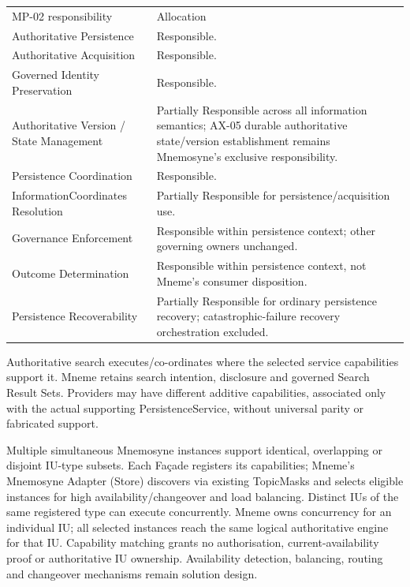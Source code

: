 \begin{longtable}{>{\raggedright\arraybackslash}p{}>{\raggedright\arraybackslash}p{}}
MP-02 responsibility & Allocation \\
Authoritative Persistence & Responsible. \\
Authoritative Acquisition & Responsible. \\
Governed Identity Preservation & Responsible. \\
Authoritative Version / State Management & Partially Responsible across all information semantics; AX-05 durable authoritative state/version establishment remains Mnemosyne’s exclusive responsibility. \\
Persistence Coordination & Responsible. \\
InformationCoordinates Resolution & Partially Responsible for persistence/acquisition use. \\
Governance Enforcement & Responsible within persistence context; other governing owners unchanged. \\
Outcome Determination & Responsible within persistence context, not Mneme’s consumer disposition. \\
Persistence Recoverability & Partially Responsible for ordinary persistence recovery; catastrophic-failure recovery orchestration excluded. \\
\end{longtable}


Authoritative search executes/co-ordinates where the selected service capabilities support it. Mneme retains search intention, disclosure and governed Search Result Sets. Providers may have different additive capabilities, associated only with the actual supporting PersistenceService, without universal parity or fabricated support.



Multiple simultaneous Mnemosyne instances support identical, overlapping or disjoint IU-type subsets. Each Façade registers its capabilities; Mneme’s Mnemosyne Adapter (Store) discovers via existing TopicMasks and selects eligible instances for high availability/changeover and load balancing. Distinct IUs of the same registered type can execute concurrently. Mneme owns concurrency for an individual IU; all selected instances reach the same logical authoritative engine for that IU. Capability matching grants no authorisation, current-availability proof or authoritative IU ownership. Availability detection, balancing, routing and changeover mechanisms remain solution design.



